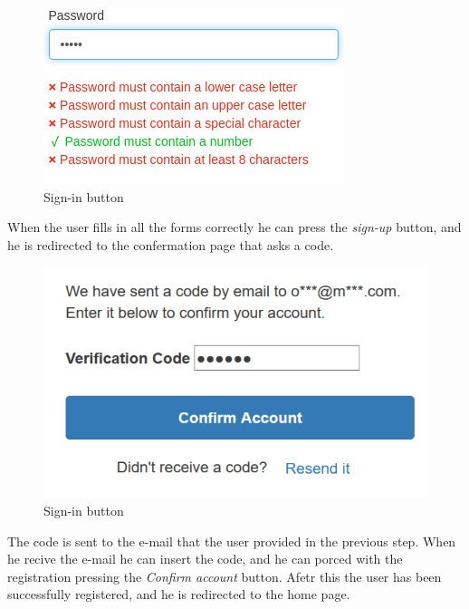 \begin{figure}[!ht]
    \caption{Sign-in button}
    \vspace{10px}
    \includegraphics[scale=0.5]{../../../../Images/userManual/insertPWD.png}
    \centering
\end{figure}When the user fills in all the forms correctly he can press the \textit{sign-up} button, and he is redirected to the confermation page that asks a code.
\begin{figure}[!ht]
    \caption{Sign-in button}
    \vspace{10px}
    \includegraphics[scale=0.3]{../../../../Images/userManual/confermationCode.png}
    \centering
\end{figure}
The code is sent to the e-mail that the user provided in the previous step. When he recive the e-mail he can insert the code, and he can porced with the registration pressing the \textit{Confirm account} button. Afetr this the user has been successfully registered, and he is redirected to the home page.

